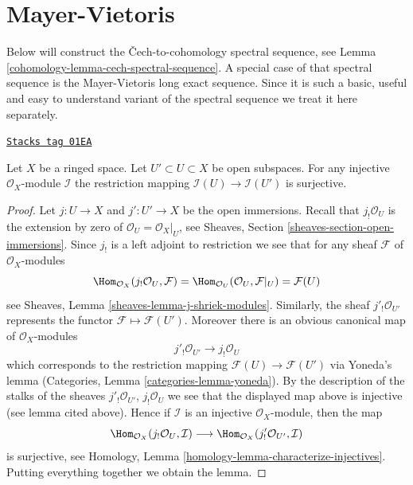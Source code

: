 \section{Mayer-Vietoris}
\label{cohomology-section-mayer-vietoris}
Below will construct the {\v C}ech-to-cohomology spectral sequence, see
Lemma \ref{cohomology-lemma-cech-spectral-sequence}.
A special case of that spectral sequence is the Mayer-Vietoris
long exact sequence. Since it is such a basic, useful and easy to understand
variant of the spectral sequence we treat it here separately.

\begin{lemma}
\label{cohomology-lemma-injective-restriction-surjective}
\href{https://stacks.math.columbia.edu/tag/01EA}{\texttt{Stacks tag 01EA}}


Let $X$ be a ringed space.
Let $U' \subset U \subset X$ be open subspaces.
For any injective $\mathcal{O}_X$-module $\mathcal{I}$ the
restriction mapping
$\mathcal{I}(U) \to \mathcal{I}(U')$ is surjective.
\end{lemma}

\begin{proof}
Let $j : U \to X$ and $j' : U' \to X$ be the open immersions.
Recall that $j_!\mathcal{O}_U$ is the extension by zero of
$\mathcal{O}_U = \mathcal{O}_X|_U$, see
Sheaves, Section \ref{sheaves-section-open-immersions}.
Since $j_!$ is a left adjoint to restriction we see that
for any sheaf $\mathcal{F}$ of $\mathcal{O}_X$-modules
$$
\Hom_{\mathcal{O}_X}(j_!\mathcal{O}_U, \mathcal{F})
=
\Hom_{\mathcal{O}_U}(\mathcal{O}_U, \mathcal{F}|_U)
=
\mathcal{F}(U)
$$
see Sheaves, Lemma \ref{sheaves-lemma-j-shriek-modules}.
Similarly, the sheaf $j'_!\mathcal{O}_{U'}$ represents the
functor $\mathcal{F} \mapsto \mathcal{F}(U')$.
Moreover there
is an obvious canonical map of $\mathcal{O}_X$-modules
$$
j'_!\mathcal{O}_{U'} \longrightarrow j_!\mathcal{O}_U
$$
which corresponds to the restriction mapping
$\mathcal{F}(U) \to \mathcal{F}(U')$ via Yoneda's lemma
(Categories, Lemma \ref{categories-lemma-yoneda}). By the description
of the stalks of the sheaves
$j'_!\mathcal{O}_{U'}$, $j_!\mathcal{O}_U$
we see that the displayed map above is injective (see lemma cited above).
Hence if $\mathcal{I}$ is an injective $\mathcal{O}_X$-module,
then the map
$$
\Hom_{\mathcal{O}_X}(j_!\mathcal{O}_U, \mathcal{I})
\longrightarrow
\Hom_{\mathcal{O}_X}(j'_!\mathcal{O}_{U'}, \mathcal{I})
$$
is surjective, see
Homology, Lemma \ref{homology-lemma-characterize-injectives}.
Putting everything together we obtain the lemma.
\end{proof}

